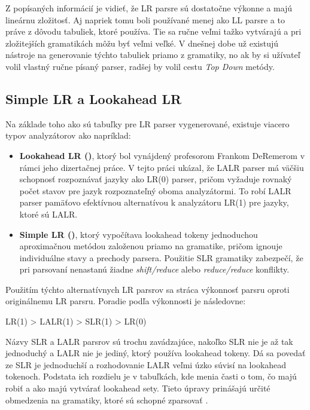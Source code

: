 Z popísaných informácií je vidieť, že LR parsre sú dostatočne výkonne a majú lineárnu zložitosť. Aj napriek tomu boli používané menej ako LL parsre a to práve z dôvodu tabuliek, ktoré používa. Tie sa ručne veľmi tažko vytvárajú a pri zložitejších gramatikách môžu byť veľmi veľké. V dnešnej dobe už existujú nástroje na generovanie týchto tabuliek priamo z gramatiky, no ak by si užívateľ volil vlastný ručne písaný parser, radšej by volil cestu \textit{Top Down} metódy.



\subsection{Simple LR a Lookahead LR}
Na základe toho ako sú tabuľky pre LR parser vygenerované, existuje viacero typov analyzátorov ako napríklad:

\begin{itemize}
\item \textbf{Lookahead LR (\textbf{})}, ktorý bol vynájdený profesorom  Frankom DeRemerom v rámci jeho dizertačnej práce\cite{deremer1969practical}. V tejto práci ukázal, že LALR parser má väčšiu schopnosť rozpoznávať jazyky ako LR(0) parser, pričom vyžaduje rovnaký počet stavov pre jazyk rozpoznateľný oboma analyzátormi. To robí LALR parser pamäťovo efektívnou alternatívou k analyzátoru LR(1) pre jazyky, ktoré sú LALR.

\item \textbf{Simple LR ()}, ktorý vypočítava lookahead tokeny jednoduchou aproximačnou metódou založenou priamo na gramatike, pričom ignouje individuálne stavy a prechody parsera. Použitie SLR gramatiky zabezpečí, že pri parsovaní nenastanú žiadne \textit{shift/reduce} alebo \textit{reduce/reduce} konflikty\cite{deremer1971simple}.
\end{itemize}

Použitím týchto alternatívnych LR parsrov sa stráca výkonnosť parsru oproti originálnemu LR parsru. Poradie podľa výkonnosti je následovne:
\begin{center}
 LR(1) > LALR(1) > SLR(1) > LR(0) \cite{grune2007parsing}
\end{center}

Názvy SLR a LALR parsrov sú trochu zavádzajúce, nakoľko SLR nie je až tak jednoduchý a LALR nie je jediný, ktorý používa lookahead tokeny. Dá sa povedať ze SLR je jednoduchší a rozhodovanie LALR veľmi úzko súvisí na lookahead tokenoch. Podstata ich rozdielu je v tabuľkách, kde menia časti o tom, čo majú robiť a ako majú vytvárať lookahead sety. Tieto úpravy prinášajú určité obmedzenia na gramatiky, ktoré sú schopné zparsovať \cite{tomassetti:parsing}.

